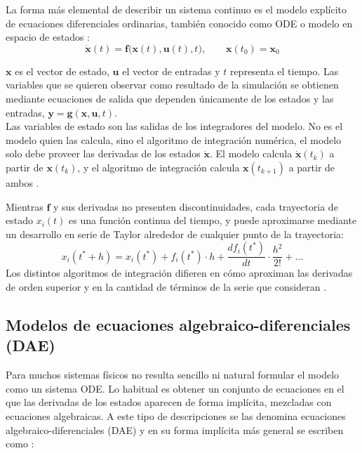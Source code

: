 La forma más elemental de describir un sistema continuo es el modelo explícito de ecuaciones diferenciales ordinarias, también conocido como ODE o modelo en espacio de estados \cite{cellier2006}:
\begin{equation}
	\dot{\mathbf{x}}(t) = \mathbf{f}\bigl(\mathbf{x}(t), \mathbf{u}(t), t\bigr), \qquad \mathbf{x}(t_0) = \mathbf{x}_0
	\label{eq:state_space}
\end{equation}

$\mathbf{x}$ es el vector de estado,  $\mathbf{u}$ el vector de entradas y $t$ representa el tiempo. Las variables que se quieren observar como resultado de la simulación se obtienen mediante ecuaciones de salida que dependen únicamente de los estados y las entradas, $\mathbf{y} = \mathbf{g}(\mathbf{x}, \mathbf{u}, t)$. \\

Las variables de estado son las salidas de los integradores del modelo. No es el modelo quien las calcula, sino el algoritmo de integración numérica, el modelo solo debe proveer las derivadas de los estados  $\dot{\mathbf{x}}$. El modelo calcula $\dot{\mathbf{x}}(t_k)$ a partir de $\mathbf{x}(t_k)$, y el algoritmo de integración calcula $\mathbf{x}(t_{k+1})$ a partir de ambos \cite{cellier2006}.

Mientras $\mathbf{f}$ y sus derivadas no presenten discontinuidades, cada trayectoria de estado $x_i(t)$ es una función continua del tiempo, y puede aproximarse mediante un desarrollo en serie de Taylor alrededor de cualquier punto de la trayectoria:
\begin{equation}
	x_i(t^* + h) = x_i(t^*) + f_i(t^*)\cdot h + \frac{d f_i(t^*)}{dt}\cdot\frac{h^2}{2!} + \dots
\end{equation}
Los distintos algoritmos de integración difieren en cómo aproximan las derivadas de orden superior y en la cantidad de términos de la serie que consideran \cite{cellier2006}.

\subsection{Modelos de ecuaciones algebraico-diferenciales (DAE)}
\label{sec:dae_section}
Para muchos sistemas físicos no resulta sencillo ni natural formular el modelo como un sistema ODE. Lo habitual es obtener un conjunto de ecuaciones en el que las derivadas de los estados aparecen de forma implícita, mezcladas con ecuaciones algebraicas. A este tipo de descripciones se las denomina ecuaciones algebraico-diferenciales (DAE) y en su forma implícita más general se escriben como \cite{cellier2006}:

